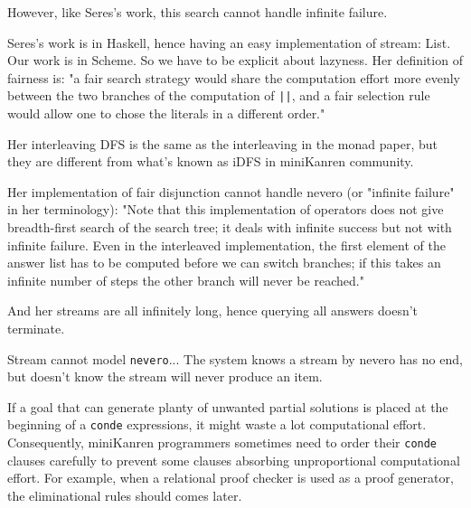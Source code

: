 \documentclass[format=acmlarge, review=true, authordraft=true]{acmart}
\begin{document}
However, like Seres's work, this search cannot handle infinite failure.

Seres's work is in Haskell, hence having an easy implementation of stream:
List. Our work is in Scheme. So we have to be explicit about lazyness.
Her definition of fairness is: "a fair search strategy would share the 
computation effort more evenly between the two branches of the computation of 
\texttt{||}, and a fair selection rule would allow one to chose the
literals in a different order."

Her interleaving DFS is the same as the interleaving in the monad paper, but 
they are different from what's known as iDFS in miniKanren community.

Her implementation of fair disjunction cannot handle nevero (or "infinite 
failure" in her terminology): "Note that this implementation of operators does 
not give breadth-first search of the search tree; it deals with infinite 
success but not with infinite failure. Even in the interleaved implementation, 
the first element of the answer list has to be computed before we can switch 
branches; if this takes an infinite number of steps the other branch will never
be reached."

And her streams are all infinitely long, hence querying all answers doesn't 
terminate.


Stream cannot model \texttt{nevero}... The system knows a stream by nevero has no end, but doesn't know the stream will never produce an item.

If a goal that can generate planty of unwanted partial 
solutions is placed at the beginning of a \texttt{conde} expressions, it might
waste a lot computational effort. Consequently, miniKanren programmers 
sometimes need to order their \texttt{conde} clauses carefully to prevent some 
clauses absorbing unproportional computational effort. For example, when a 
relational proof checker is used as a proof generator, the eliminational rules 
should comes later.


\end{document}

